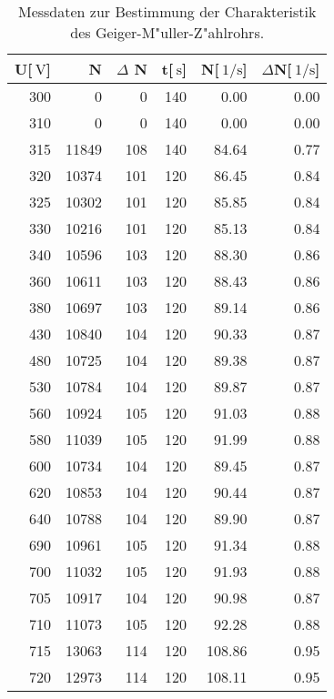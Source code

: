 
\begin{table}[!h]
\begin{center}
\begin{tabular}{|r|r|r|r|r|r|}
\hline
U[$\SI{}{\volt}$] &	N & $\Delta$ N & t[$\SI{}{\second}$] & N[$\SI{}{1\per\second}$] & $\Delta$N[$\SI{}{1\per\second}$]\\
\hline
\hline
300	 &   0	    & 0	&  140 & 0.00 & 0.00\\
310	 &   0	    & 0	&  140 & 0.00 & 0.00\\
315	 &   11849	& 108	&  140 & 84.64	& 0.77\\
320	 &   10374	& 101	&  120 & 86.45	& 0.84\\
325	 &   10302	& 101	&  120 & 85.85	& 0.84\\
330	 &   10216	& 101	&  120 & 85.13	& 0.84\\
340	 &   10596	& 103	&  120 & 88.30	& 0.86\\
360	 &   10611	& 103	&  120 & 88.43	& 0.86\\
380	 &   10697	& 103	&  120 & 89.14	& 0.86\\
430	 &   10840	& 104	&  120 & 90.33	& 0.87\\
480	 &   10725	& 104	&  120 & 89.38	& 0.87\\
530	 &   10784	& 104	&  120 & 89.87	& 0.87\\
560	 &   10924	& 105	&  120 & 91.03	& 0.88\\
580	 &   11039	& 105	&  120 & 91.99	& 0.88\\
600	 &   10734	& 104	&  120 & 89.45	& 0.87\\
620	 &   10853	& 104	&  120 & 90.44	& 0.87\\
640	 &   10788	& 104	&  120 & 89.90	& 0.87\\
690	 &   10961	& 105	&  120 & 91.34	& 0.88\\
700	 &   11032	& 105	&  120 & 91.93	& 0.88\\
705	 &   10917	& 104	&  120 & 90.98	& 0.87\\
710	 &   11073	& 105	&  120 & 92.28	& 0.88\\
715	 &   13063	& 114	&  120 & 108.86 & 0.95\\
720	 &   12973	& 114	&  120 & 108.11 & 0.95
\hline
\end{tabular}
\caption[Aufgabe a]{Messdaten zur Bestimmung der Charakteristik des Geiger-M"uller-Z"ahlrohrs.}
\label{tabellea}
\end{center}
\end{table}